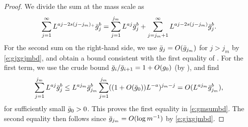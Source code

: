 \begin{proof}
We divide the sum at the mass scale as
\begin{equation} \label{e:xpr-2sums}
\sum_{j=1}^\infty L^{aj - 2s (j - j_m)_+} \bar{g}_j^{b}
= \sum_{j=1}^{j_m} L^{aj} \bar{g}_j^{b} +  \sum_{j=j_m+1}^\infty L^{aj - 2s (j - j_m)} \bar{g}_{j}^{b}.
\end{equation}
For the second sum on the right-hand side, we use $\bar{g}_j = O(\bar{g}_{j_m})$ for $j > j_m$
by \eqref{e:gjxgjmbd},
and obtain
a bound consistent with the first equality of .
For the first term, we use the crude bound
$\bar{g}_i/\bar{g}_{i+1} = 1+O(g_0)$ (by
\cite[Lemma~\ref{flow-lem:elementary-recursion}]{BBS-rg-flow}), and find
\begin{equation}
  \sum_{j=1}^{j_m} L^{aj} \bar{g}_j^b
  \leq
  L^{aj_m} \bar{g}_{j_m}^b
  \sum_{j=1}^{j_m} ((1+O(\bar{g}_0))L^{-a})^{j_m-j}
  =
  O(L^{aj_m} \bar{g}_{j_m}^b),
\end{equation}
for sufficiently small $\bar{g}_0>0$.
This proves the first equality in \eqref{e:gmsumbd}.
The second equality then follows since
$\bar{g}_{j_m} = O(\log m^{-1})$ by \eqref{e:gjxgjmbd}.
\end{proof}